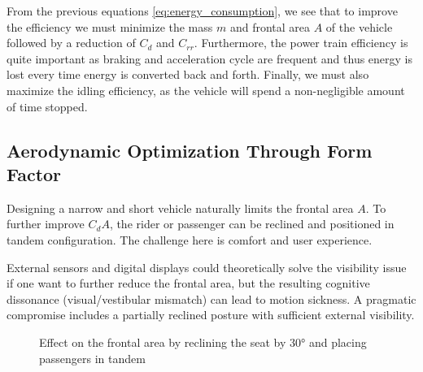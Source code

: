 From the previous equations \eqref{eq:energy_consumption}, we see that to improve the efficiency we must minimize the mass $m$ and frontal area $A$ of the vehicle followed by a reduction of $C_d$ and $C_{rr}$. Furthermore, the power train efficiency is quite important as braking and acceleration cycle are frequent and thus energy is lost every time energy is converted back and forth. Finally, we must also maximize the idling efficiency, as the vehicle will spend a non-negligible amount of time stopped.


\subsection{Aerodynamic Optimization Through Form Factor}

Designing a narrow and short vehicle naturally limits the frontal area $A$. To further improve $C_d A$, the rider or passenger can be reclined and positioned in tandem configuration. The challenge here is comfort and user experience.

External sensors and digital displays could theoretically solve the visibility issue if one want to further reduce the frontal area, but the resulting cognitive dissonance (visual/vestibular mismatch) can lead to motion sickness. A pragmatic compromise includes a partially reclined posture with sufficient external visibility.

\begin{figure}[h!]
    \centering
    \hfill
    \caption{Effect on the frontal area by reclining the seat by 30° and placing passengers in tandem}
    \label{fig:FrontaAreaGraphicsComparison}
\end{figure}


